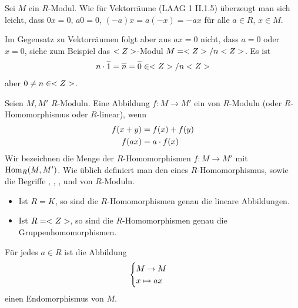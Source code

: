 \begin{remark}
	Sei $M$ ein $R$-Modul. Wie für Vektorräume (LAAG 1 II.1.5) überzeugt man sich leicht, dass $0x=0$, $a0=0$, $(-a)x=a(-x)=-ax$ für alle $a\in R$, $x\in M$. 
	
	Im Gegensatz zu Vektorräumen folgt aber aus $ax=0$ nicht, dass $a=0$ oder $x=0$, siehe zum Beispiel das $<Z>$-Modul $M=<Z>/n<Z>$. Es ist
	\begin{align}
		n\cdot\overline{1}=\overline{n}=\overline{0}\in\whole/n\whole\notag
	\end{align}
	aber $0\neq n\in<Z>$.
\end{remark}

\begin{definition}
	Seien $M,M'$ $R$-Moduln. Eine Abbildung $f:M\to M'$ ein  von $R$-Moduln (oder $R$-Homomorphismus oder $R$-linear), wenn
	\begin{align}
		f(x+y)&=f(x)+f(y) \notag \\
		f(ax) &= a\cdot f(x)\notag
	\end{align}
	Wir bezeichnen die Menge der $R$-Homomorphismen $f:M\to M'$ mit $\operatorname{Hom}_R(M,M')$. Wie üblich definiert man den  eines $R$-Homomorphismus, sowie die Begriffe , , ,  und  von $R$-Moduln.
\end{definition}

\begin{example}
	\begin{itemize}
		\item Ist $R=K$, so sind die $R$-Homomorphismen genau die lineare Abbildungen.
		\item Ist $R=<Z>$, so sind die $R$-Homomorphismen genau die Gruppenhomomorphismen.
	\end{itemize}
\end{example}

\begin{example}
	Für jedes $a\in R$ ist die Abbildung
	\begin{align}
		\begin{cases}
		M\to M \\ x\mapsto ax
		\end{cases}\notag
	\end{align}
	einen Endomorphismus von $M$.
\end{example}


